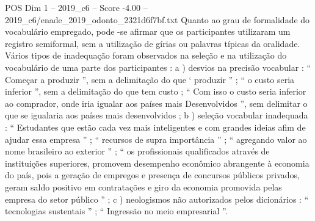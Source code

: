 \begin{textsample}{POS Dim 1 – 2019\_c6 – Score -4.00 – 2019\_c6/enade\_2019\_odonto\_2321d6f7bf.txt}
Quanto ao grau de formalidade do vocabulário empregado, pode -se afirmar que os participantes utilizaram um registro semiformal, sem a utilização de gírias ou palavras típicas da oralidade.
Vários tipos de inadequação foram observados na seleção e na utilização do vocabulário de uma parte dos participantes : a ) desvios na precisão vocabular : “ Começar a produzir ”, sem a delimitação do que ‘ produzir ” ; “ o custo seria inferior ”, sem a delimitação do que tem custo ; “ Com isso o custo seria inferior ao comprador, onde iria igualar aos países mais Desenvolvidos ”, sem delimitar o que se igualaria aos países mais desenvolvidos ; b ) seleção vocabular inadequada : “ Estudantes que estão cada vez mais inteligentes e com grandes ideias afim de ajudar essa empresa ” ; “ recursos de supra importância ” ; “ agregando valor ao nome brasileiro ao exterior ” ; “ os profissionais qualificados através de instituições superiores, promovem desempenho econômico abrangente à economia do país, pois a geração de empregos e presença de concursos públicos privados, geram saldo positivo em contratações e giro da economia promovida pelas empresa do setor público ” ; c ) neologismos não autorizados pelos dicionários : “ tecnologias sustentais ” ; “ Ingressão no meio empresarial ”.

\end{textsample}
